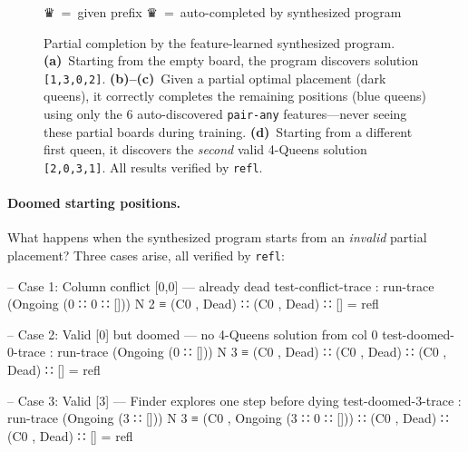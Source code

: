 \begin{figure}[t]
\centering
{}%
\hspace{0.4cm}%
%
\hspace{0.4cm}%
%
\hspace{0.4cm}%
%

\medskip
{\footnotesize \textcolor{nord0}{\LARGE\sffamily ♛}~=~given prefix \qquad \textcolor{nord10}{\LARGE\sffamily ♛}~=~auto-completed by synthesized program}
\caption{Partial completion by the feature-learned synthesized program.  \textbf{(a)}~Starting from the empty board, the program discovers solution \texttt{[1,3,0,2]}.  \textbf{(b)--(c)}~Given a partial optimal placement (dark queens), it correctly completes the remaining positions (blue queens) using only the 6 auto-discovered \texttt{pair-any} features---never seeing these partial boards during training.  \textbf{(d)}~Starting from a different first queen, it discovers the \emph{second} valid 4-Queens solution \texttt{[2,0,3,1]}.  All results verified by \texttt{refl}.}
\label{fig:queens-partial}
\end{figure}

\paragraph{Doomed starting positions.}
What happens when the synthesized program starts from an \emph{invalid} partial placement?  Three cases arise, all verified by \texttt{refl}:

\begin{spec}
-- Case 1: Column conflict [0,0] — already dead
test-conflict-trace : run-trace (Ongoing (0 ∷ 0 ∷ [])) N 2
  ≡ (C0 , Dead) ∷ (C0 , Dead) ∷ []                    = refl

-- Case 2: Valid [0] but doomed — no 4-Queens solution from col 0
test-doomed-0-trace : run-trace (Ongoing (0 ∷ [])) N 3
  ≡ (C0 , Dead) ∷ (C0 , Dead) ∷ (C0 , Dead) ∷ []      = refl

-- Case 3: Valid [3] — Finder explores one step before dying
test-doomed-3-trace : run-trace (Ongoing (3 ∷ [])) N 3
  ≡ (C0 , Ongoing (3 ∷ 0 ∷ [])) ∷
    (C0 , Dead) ∷ (C0 , Dead) ∷ []                     = refl
\end{spec}

